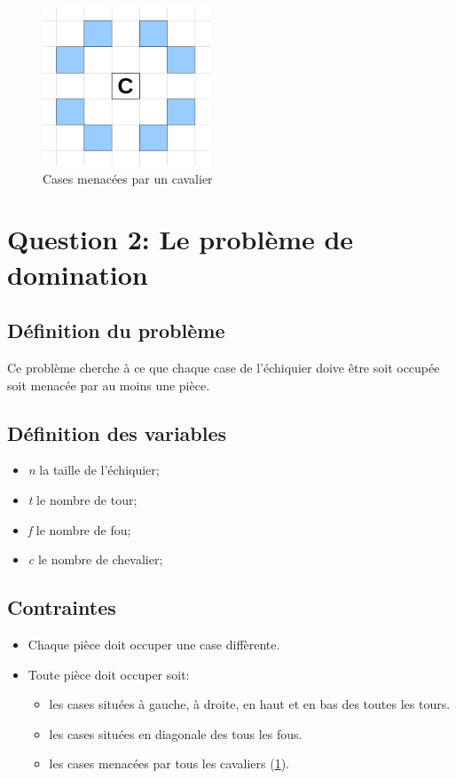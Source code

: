 \documentclass[letterpaper]{article}
\begin{document}
\begin{figure}[ht]
  \centering
  \label{fig:cavalier}
  \includegraphics[width=5cm]{fig/cavalier.png}
  \caption{Cases menacées par un cavalier}
\end{figure}

\section{Question 2: Le problème de domination}

\subsection{Définition du problème}

Ce problème cherche à ce que chaque case de l'échiquier doive être soit
occupée soit menacée par au moins une pièce.

\subsection{Définition des variables}

\begin{itemize}
\item \textit{n} la taille de l'échiquier;
\item \textit{t} le nombre de tour;
\item \textit{f} le nombre de fou;
\item \textit{c} le nombre de chevalier;
\end{itemize}

\subsection{Contraintes}

\begin{itemize}
\item Chaque pièce doit occuper une case diffèrente.
\item Toute pièce doit occuper soit:
  \begin{itemize}
  \item les cases situées à gauche, à droite, en haut et en bas des
    toutes les tours.
  \item les cases situées en diagonale des tous les fous.
  \item les cases menacées par tous les cavaliers (\ref{fig:cavalier}).
  \end{itemize}
\end{itemize}
\end{document}
